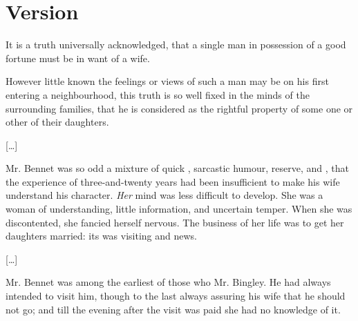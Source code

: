 \documentclass{fiche}
\begin{document}
\newpage
\section{Version}

\begin{version}
It is a truth universally acknowledged, that a single man in possession of a good fortune must
be in want of a wife.

However little known the feelings or views of such a man may be on his first entering a
neighbourhood, this truth is so well fixed in the minds of the surrounding families, that he
is considered as the rightful property of some one or other of their daughters.

[\ldots]

Mr. Bennet was so odd a mixture of quick , sarcastic
humour, reserve, and , that the experience of
three-and-twenty years had been insufficient to make his wife understand his character.
\emph{Her} mind was less difficult to  develop. She was a woman of 
understanding, little information, and uncertain temper. When she was discontented, she
fancied herself nervous. The business of her life was to get her daughters married: its
 was visiting and news.

[\ldots]

Mr. Bennet was among the earliest of those who  Mr. Bingley. He had always intended to visit him, though to the last always
assuring his wife that he should not go; and till the evening after the visit was paid she had
no knowledge of it.
\end{version}

\end{document}
